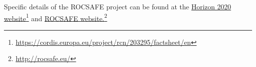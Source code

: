 Specific details of the ROCSAFE project can be found at the \href{https://cordis.europa.eu/project/rcn/203295/factsheet/en}{Horizon 2020 website}\footnote{\href {https://cordis.europa.eu/project/rcn/203295/factsheet/en}{https://cordis.europa.eu/project/rcn/203295/factsheet/en}} 
and 
\href{http://rocsafe.eu/}{ROCSAFE website.}\footnote{\href {http://rocsafe.eu/}{http://rocsafe.eu/}}